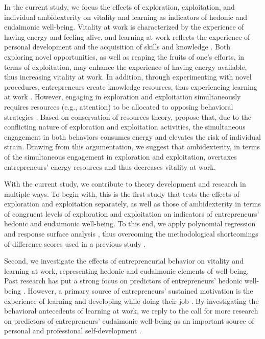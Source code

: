 \documentclass[man]{apa7}
\begin{document}
In the current study, we focus the effects of exploration, exploitation, and individual ambidexterity on vitality and learning as indicators of hedonic and eudaimonic well-being. 
Vitality at work is characterized by the experience of having energy and feeling alive, and learning at work reflects the experience of personal development and the acquisition of skills and knowledge \parencite{Spreitzer.2005b}. 
Both exploring novel opportunities, as well as reaping the fruits of one's efforts, in terms of exploitation, may enhance the experience of having energy available, thus increasing vitality at work. 
In addition, through experimenting with novel procedures, entrepreneurs create knowledge resources, thus experiencing learning at work \parencite[e.g.][]{Kolb2009, Spreitzer.2005b}.
However, engaging in exploration and exploitation simultaneously requires resources (e.g., attention) to be allocated to opposing behavioral strategies \parencite{Laureiro-Martinez2010}. 
Based on conservation of resources \parencite[COR;][]{Hobfoll.1989} theory, \textcite{Hunter2017} propose that, due to the conflicting nature of exploration and exploitation activities, the simultaneous engagement in both behaviors consumes energy and elevates the risk of individual strain.
Drawing from this argumentation, we suggest that ambidexterity, in terms of the simultaneous engagement in exploration and exploitation, overtaxes entrepreneurs' energy resources and thus decreases vitality at work. \par 

With the current study, we contribute to theory development and research in multiple ways.
To begin with, this is the first study that tests the effects of exploration and exploitation separately, as well as those of ambidexterity in terms of congruent levels of exploration and exploitation on indicators of entrepreneurs' hedonic and eudaimonic well-being. To this end, we apply polynomial regression and response surface analysis \parencite{Edwards.1993a, Shanock.2010b, box2007response, Humberg2019}, thus overcoming the methodological shortcomings of difference scores used in a previous study \parencite{Keller2015}. \par 

Second, we investigate the effects of entrepreneurial behavior on vitality and learning at work, representing hedonic and eudaimonic elements of well-being. 
Past research has put a strong focus on predictors of entrepreneurs' hedonic well-being \parencite[see][]{Stephan2018, Ryff2019}. 
However, a primary source of entrepreneurs' sustained motivation is the experience of learning and developing while doing their job \parencite{Jayawarna2013}.   
By investigating the behavioral antecedents of learning at work, we reply to the call for more research on predictors of entrepreneurs' eudaimonic well-being as an important source of personal and professional self-development \parencite{Stephan2018, Ryff2019}. \par 
\end{document}
